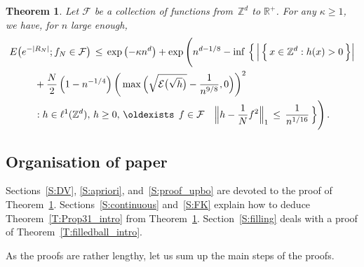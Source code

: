 \documentclass[10pt]{amsart}
\newtheorem{theo}{Theorem}[section]
\theoremstyle{definition}\newtheorem{defi}[theo]{Definition}\newtheorem{rema}[theo]{Remark}\newtheorem{exam}[theo]{Example}\newtheorem{exem}[theo]{Example}\newtheorem{nota}[theo]{Notation}
\newcommand*\Zd {{\mathbb Z^d}}
\newcommand*\R{\mathbb{R}}
\newcommand{\cE}{\mathcal{E}}
\newcommand{\cF}{\mathcal{F}}
\renewcommand*{\exists}{\mathrel{\oldexists}}
\begin{document}
\begin{theo}\label{upbo}
Let $\cF$ be a collection of functions from~$\Zd$ to $\R^+$. For any $\kappa\geq 1$, we have, for $n$ large enough,
\begin{multline*}
E\big(e^{-|R_N|}; f_N\in\cF\big)\,\leq\,
\exp\left(-\kappa n^d\right)+
\exp\Bigg(n^{d-1/8}-
\inf\,\Big\{\,
\Big|\,\Big\{\,x\in \Zd: h(x)>0
\,\Big\}\Big|\\
\begin{aligned}
&+\frac{N}{2} \left(1-n^{-1/4}\right)
\bigg(\max\Big(
\sqrt{\cE\big(\sqrt{h}\big)}-
\frac{1}{n^{9/8}},0\Big) \bigg)^2
\\
&:h\in \ell^1(\Zd),\,h \geq 0,\,
\exists\,f\in\cF\quad
\Big\|h-\frac{1}{N}f^2\Big\|_{1}
\,\leq\,\frac{1}{n^{1/16}}
\,\Big\}\Bigg)\,.
\end{aligned}
\end{multline*}
\end{theo}

\subsection{Organisation of paper}

Sections~\ref{S:DV}, \ref{S:apriori}, and~\ref{S:proof_upbo} are devoted to the proof of Theorem~\ref{upbo}. Sections~\ref{S:continuous} and~\ref{S:FK} explain how to deduce Theorem~\ref{T:Prop31_intro} from Theorem~\ref{upbo}. Section~\ref{S:filling} deals with a proof of Theorem~\ref{T:filledball_intro}.

As the proofs are rather lengthy, let us sum up the main steps of the proofs.

\end{document}
